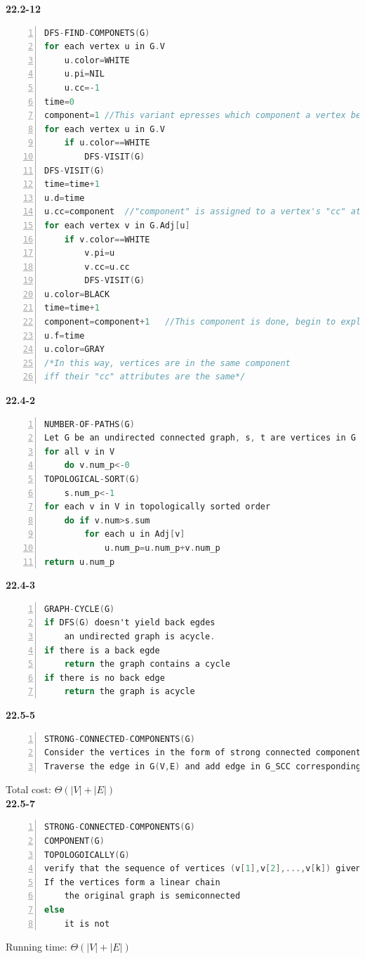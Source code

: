 \documentclass{article}
\begin{document}
\textbf{22.2-12}
\begin{lstlisting}[language=C,numbers=left]
DFS-FIND-COMPONETS(G)
for each vertex u in G.V
	u.color=WHITE
	u.pi=NIL
	u.cc=-1
time=0
component=1	//This variant epresses which component a vertex belong to
for each vertex u in G.V
	if u.color==WHITE
		DFS-VISIT(G)
DFS-VISIT(G)
time=time+1
u.d=time
u.cc=component	//"component" is assigned to a vertex's "cc" attribute
for each vertex v in G.Adj[u]
	if v.color==WHITE
		v.pi=u
		v.cc=u.cc
		DFS-VISIT(G)
u.color=BLACK
time=time+1
component=component+1	//This component is done, begin to explore another component
u.f=time
u.color=GRAY	
/*In this way, vertices are in the same component
iff their "cc" attributes are the same*/
\end{lstlisting} 
\textbf{22.4-2}
\begin{lstlisting}[language=C,numbers=left]
NUMBER-OF-PATHS(G)
Let G be an undirected connected graph, s, t are vertices in G
for all v in V
	do v.num_p<-0
TOPOLOGICAL-SORT(G)
	s.num_p<-1
for each v in V in topologically sorted order
	do if v.num>s.sum
		for each u in Adj[v]
			u.num_p=u.num_p+v.num_p
return u.num_p		 
\end{lstlisting}
\textbf{22.4-3}
\begin{lstlisting}[language=C,numbers=left]
GRAPH-CYCLE(G)
if DFS(G) doesn't yield back egdes
	an undirected graph is acycle.
if there is a back egde
	return the graph contains a cycle
if there is no back edge
	return the graph is acycle
\end{lstlisting}
\textbf{22.5-5}
\begin{lstlisting}[language=C,numbers=left]
STRONG-CONNECTED-COMPONENTS(G)
Consider the vertices in the form of strong connected components, choose a vertex in each components into G_SCC
Traverse the edge in G(V,E) and add edge in G_SCC correspondingly. 
\end{lstlisting}
Total cost: $\Theta(|V|+|E|)$\\
\textbf{22.5-7}
\begin{lstlisting}[language=C,numbers=left]
STRONG-CONNECTED-COMPONENTS(G)
COMPONENT(G)
TOPOLOGOICALLY(G)
verify that the sequence of vertices (v[1],v[2],...,v[k]) given by topological sort.
If the vertices form a linear chain
	the original graph is semiconnected
else
	it is not
\end{lstlisting}
Running time: $\Theta(|V|+|E|)$
\end{document}
